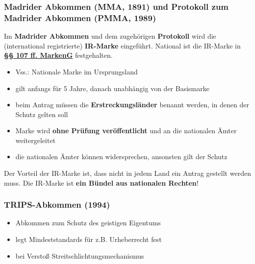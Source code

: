 \documentclass[12pt,A4]{extarticle}
\newcommand{\highlight}[1]{\textcolor{highlightColor}{\textbf{#1}}}
\newcommand{\markenGG}[2][]{\textbf{\textcolor{markenGesetzLink}{\href{https://www.gesetze-im-internet.de/markeng/__#2.html}{§§ #1 MarkenG}}}}
\begin{document}
\subsubsection{Madrider Abkommen (MMA, 1891) und Protokoll zum Madrider Abkommen (PMMA, 1989)}\label{sec:IRMarke}
Im \textbf{Madrider Abkommen} und dem zugehörigen \textbf{Protokoll} wird die (international registrierte) \highlight{IR-Marke} eingeführt. National ist die IR-Marke in \markenGG[107 ff.]{107} festgehalten.
\begin{itemize}
  \item{Vss.: Nationale Marke im Ursprungsland}
  \item{gilt anfangs für 5 Jahre, danach unabhängig von der Basismarke}
  \item{beim Antrag müssen die \textbf{Erstreckungsländer} benannt werden, in denen der Schutz gelten soll}
  \item{Marke wird \textbf{ohne Prüfung veröffentlicht} und an die nationalen Ämter weitergeleitet}
  \item{die nationalen Ämter können widersprechen, ansonsten gilt der Schutz}
\end{itemize}
Der Vorteil der IR-Marke ist, dass nicht in jedem Land ein Antrag gestellt werden muss. Die IR-Marke ist \textbf{ein Bündel aus nationalen Rechten}!

\subsubsection{TRIPS-Abkommen (1994)}
\begin{itemize}
  \item{Abkommen zum Schutz des geistigen Eigentums}
  \item{legt Mindeststandards für z.B. Urheberrecht fest}
  \item{bei Verstoß Streitschlichtungsmechanismus}
\end{itemize}
\end{document}

